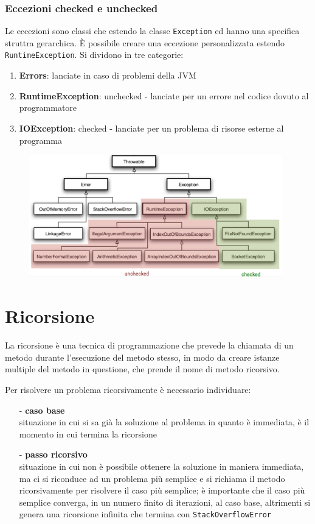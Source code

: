 \documentclass[a4paper]{article}
\begin{document}
\subsubsection*{Eccezioni checked e unchecked}
Le eccezioni sono classi che estendo la classe \verb|Exception| ed hanno una specifica struttra gerarchica. È possibile creare
una eccezione personalizzata estendo \verb|RuntimeException|. Si dividono in tre categorie:
\begin{enumerate} [topsep=3pt, itemsep=0pt]
	\item \textbf{Errors}: lanciate in caso di problemi della JVM
	\item \textbf{RuntimeException}: unchecked - lanciate per un errore nel codice dovuto al programmatore
	\item \textbf{IOException}: checked - lanciate per un problema di risorse esterne al programma
\end{enumerate}

\begin{figure}[h]
	\centering
	\includegraphics[width=11cm]{eccezioni.png}
\end{figure}

\newpage


\section{Ricorsione}
La ricorsione è una tecnica di programmazione che prevede la chiamata di un metodo durante l'esecuzione del metodo stesso, in modo
da creare istanze multiple del metodo in questione, che prende il nome di metodo ricorsivo.

Per risolvere un problema ricorsivamente è necessario individuare:
\begin{itemize} [topsep=3pt, itemsep=0pt]
	\item[-] \textbf{caso base} \\
	situazione in cui si sa già la soluzione al problema in quanto è immediata, è il momento in cui termina la ricorsione 
	\item[-] \textbf{passo ricorsivo} \\
	situazione in cui non è possibile ottenere la soluzione in maniera immediata, ma ci si riconduce ad un problema più semplice e
	si richiama il metodo ricorsivamente per risolvere il caso più semplice; è importante che il caso più semplice converga, in un
	numero finito di iterazioni, al caso base, altrimenti si genera una ricorsione infinita che termina con \verb|StackOverflowError|
\end{itemize}
\end{document}
